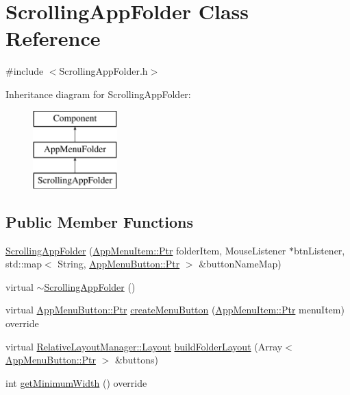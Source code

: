 \hypertarget{classScrollingAppFolder}{}\section{Scrolling\+App\+Folder Class Reference}
\label{classScrollingAppFolder}


{\ttfamily \#include $<$Scrolling\+App\+Folder.\+h$>$}

Inheritance diagram for Scrolling\+App\+Folder\+:\begin{figure}[H]
\begin{center}
\leavevmode
\includegraphics[height=3.000000cm]{classScrollingAppFolder}
\end{center}
\end{figure}
\subsection*{Public Member Functions}
\begin{DoxyCompactItemize}
\item 
\mbox{\hyperlink{classScrollingAppFolder_aee7c9bd772c6f165da44fda12516c9cb}{Scrolling\+App\+Folder}} (\mbox{\hyperlink{classAppMenuItem_ab5f51c5d74f8df62b8862c0cc8126cb7}{App\+Menu\+Item\+::\+Ptr}} folder\+Item, Mouse\+Listener $\ast$btn\+Listener, std\+::map$<$ String, \mbox{\hyperlink{classAppMenuButton_aeb692efb6a933970de8eac14e5e71544}{App\+Menu\+Button\+::\+Ptr}} $>$ \&button\+Name\+Map)
\item 
virtual \mbox{\hyperlink{classScrollingAppFolder_a9df9aec2fac0ded2ac8bd15daf22c157}{$\sim$\+Scrolling\+App\+Folder}} ()
\item 
virtual \mbox{\hyperlink{classAppMenuButton_aeb692efb6a933970de8eac14e5e71544}{App\+Menu\+Button\+::\+Ptr}} \mbox{\hyperlink{classScrollingAppFolder_a5e27c332bbccd63bef240ec1a542e83e}{create\+Menu\+Button}} (\mbox{\hyperlink{classAppMenuItem_ab5f51c5d74f8df62b8862c0cc8126cb7}{App\+Menu\+Item\+::\+Ptr}} menu\+Item) override
\item 
virtual \mbox{\hyperlink{classRelativeLayoutManager_a3dcd4cd0bc41754f3b4a64bc29b5eca5}{Relative\+Layout\+Manager\+::\+Layout}} \mbox{\hyperlink{classScrollingAppFolder_a0ca4125e95f81e6ae5eee23e3040ab8c}{build\+Folder\+Layout}} (Array$<$ \mbox{\hyperlink{classAppMenuButton_aeb692efb6a933970de8eac14e5e71544}{App\+Menu\+Button\+::\+Ptr}} $>$ \&buttons)
\item 
int \mbox{\hyperlink{classScrollingAppFolder_aa70592d62c840b03bb1ad3602a34ef96}{get\+Minimum\+Width}} () override
\end{DoxyCompactItemize}
